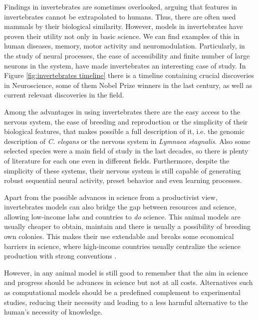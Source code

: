 Findings in invertebrates are sometimes overlooked, arguing that features in invertebrates cannot be extrapolated to humans. Thus, there are often used mammals by their biological similarity. However, models in invertebrates have proven their utility not only in basic science. We can find examples of this in human diseases, memory, motor activity and neuromodulation. Particularly, in the study of neural processes, the ease of accessibility and finite number of large neurons in the system, have made invertebrates an interesting case of study. In Figure \ref{fig:invertebrates timeline} there is a timeline containing crucial discoveries in Neuroscience, some of them Nobel Prize winners in the last century, as well as current relevant discoveries in the field. 

Among the advantages in using invertebrates there are the easy access to the nervous system, the ease of breeding and reproduction or the simplicity of their biological features, that makes possible a full description of it, i.e. the genomic description of \textit{C. elegans} or the nervous system in \textit{Lymnaea stagnalis}. Also some selected species were a main field of study in the last decades, so there is plenty of literature for each one even in different fields. Furthermore, despite the simplicity of these systems, their nervous system is still capable of generating robust sequential neural activity, preset behavior and even learning processes. 


Apart from the possible advances in science from a productivist view, invertebrates models can also bridge the gap between resources and science, allowing low-income labs and countries to \textit{do} science. This animal models are usually cheaper to obtain, maintain and there is usually a possibility of breeding own colonies. This makes their use extendable and breaks some economical barriers in science, where high-income countries usually centralize the science production with strong conventions \parencite{castillo_spineless_2017,stephan_how_2015}. 


However, in any animal model is still good to remember that the aim in science and progress should be advances in science but not at all costs. Alternatives such as computational models should be a predefined complement to experimental studies, reducing their necessity and leading to a less harmful alternative to the human's necessity of knowledge. 


